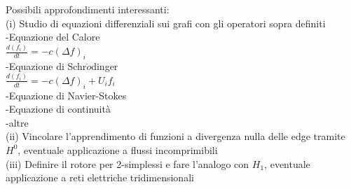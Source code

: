 \documentclass[../main.tex]{subfiles}
\begin{document}
	Possibili approfondimenti interessanti:\\
	(i)   Studio di equazioni differenziali sui grafi con gli operatori sopra definiti\\
	      -Equazione del Calore\\
	      $\frac{d(f_i)}{dt} = -c(\Delta f)_i$\\
	      -Equazione di Schr$\ddot{o}$dinger\\
	      $\frac{d(f_i)}{dt} = -c(\Delta f)_i + U_i f_i$\\
	      -Equazione di Navier-Stokes\\
	      -Equazione di continuità\\
	      -altre\\
	(ii)  Vincolare l'apprendimento di funzioni a divergenza nulla delle edge tramite $H^0$, eventuale applicazione a flussi incomprimibili\\
	(iii) Definire il rotore per 2-simplessi e fare l'analogo con $H_1$, eventuale applicazione a reti elettriche tridimensionali\\
\end{document}
